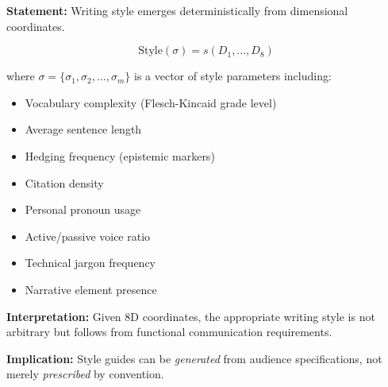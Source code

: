 \begin{tcolorbox}[colback=gray!5!white, colframe=gray!75!black,
    title=Axiom DT-7: Style Emergence]
\textbf{Statement:} Writing style emerges deterministically from dimensional coordinates.

\begin{equation}
\text{Style}(\sigma) = s(D_1, ..., D_8)
\end{equation}

where $\sigma = \{\sigma_1, \sigma_2, ..., \sigma_m\}$ is a vector of style parameters including:
\begin{itemize}[nosep]
\item Vocabulary complexity (Flesch-Kincaid grade level)
\item Average sentence length
\item Hedging frequency (epistemic markers)
\item Citation density
\item Personal pronoun usage
\item Active/passive voice ratio
\item Technical jargon frequency
\item Narrative element presence
\end{itemize}

\textbf{Interpretation:} Given 8D coordinates, the appropriate writing style is not arbitrary
but follows from functional communication requirements.

\textbf{Implication:} Style guides can be \textit{generated} from audience specifications,
not merely \textit{prescribed} by convention.
\end{tcolorbox}

